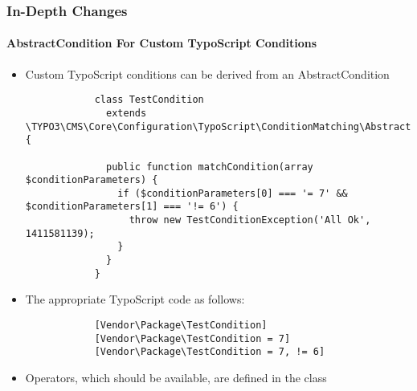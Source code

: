 
\begin{frame}[fragile]
	\frametitle{In-Depth Changes}
	\framesubtitle{AbstractCondition For Custom TypoScript Conditions}

	\lstset{
		basicstyle=\tiny\ttfamily
	}

	\begin{itemize}
		\item Custom TypoScript conditions can be derived from an AbstractCondition

		\begin{lstlisting}
			class TestCondition
			  extends \TYPO3\CMS\Core\Configuration\TypoScript\ConditionMatching\AbstractCondition {

			  public function matchCondition(array $conditionParameters) {
 			    if ($conditionParameters[0] === '= 7' && $conditionParameters[1] === '!= 6') {
			      throw new TestConditionException('All Ok', 1411581139);
			    }
			  }
			}
		\end{lstlisting}

		\item The appropriate TypoScript code as follows:

		\begin{lstlisting}
			[Vendor\Package\TestCondition]
			[Vendor\Package\TestCondition = 7]
			[Vendor\Package\TestCondition = 7, != 6]
		\end{lstlisting}

		\item Operators, which should be available, are defined in the class

	\end{itemize}

\end{frame}


